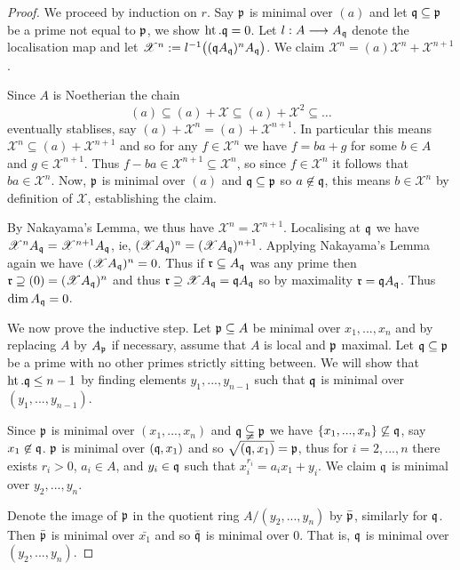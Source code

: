 \documentclass[12pt]{article}
\theoremstyle{plain}
\theoremstyle{definition}
\newcommand{\scr}[1]{\mathscr{#1}}
\newcommand{\lto}{\longrightarrow}
\begin{document}
	\begin{proof}
		We proceed by induction on $r$. Say $\frak{p}$ is minimal over $(a)$ and let $\frak{q} \subseteq \frak{p}$ be a prime not equal to $\frak{p}$, we show $\operatorname{ht}.\frak{q} = 0$. Let $l: A \lto A_\frak{q}$ denote the localisation map and let $\scr{X}^n:= l^{-1}\big((\frak{q}A_\frak{q})^nA_\frak{q}\big)$. We claim $\scr{X}^n = (a)\scr{X}^n + \scr{X}^{n+1}$.
		
		Since $A$ is Noetherian the chain
		\[(a) \subseteq (a) + \scr{X} \subseteq (a) + \scr{X}^2 \subseteq \hdots\]
		eventually stablises, say $(a) + \scr{X}^n = (a) + \scr{X}^{n+1}$. In particular this means $\scr{X}^n \subseteq (a) + \scr{X}^{n+1}$ and so for any $f \in \scr{X}^n$ we have $f = ba + g$ for some $b \in A$ and $g \in \scr{X}^{n+1}$. Thus $f - ba \in \scr{X}^{n+1} \subseteq \scr{X}^n$, so since $f \in \scr{X}^n$ it follows that $ba \in \scr{X}^n$. Now, $\frak{p}$ is minimal over $(a)$ and $\frak{q} \subseteq \frak{p}$ so $a \not\in \frak{q}$, this means $b \in \scr{X}^n$ by definition of $\scr{X}$, establishing the claim.
		
		By Nakayama's Lemma, we thus have $\scr{X}^n = \scr{X}^{n+1}$. Localising at $\frak{q}$ we have $\scr{X}^nA_\frak{q} = \scr{X}^{n+1}A_\frak{q}$, ie, $(\scr{X}A_\frak{q})^n = (\scr{X}A_\frak{q})^{n+1}$. Applying Nakayama's Lemma again we have $(\scr{X} A_\frak{q})^n = 0$. Thus if $\frak{r} \subseteq A_\frak{q}$ was any prime then $\frak{r} \supseteq (0) = (\scr{X}A_\frak{q})^n$ and thus $\frak{r} \supseteq \scr{X}A_\frak{q} = \frak{q}A_\frak{q}$ so by maximality $\frak{r} = \frak{q}A_\frak{q}$. Thus $\operatorname{dim}A_\frak{q} = 0$.
		
		We now prove the inductive step. Let $\frak{p} \subseteq A$ be minimal over $x_1,...,x_n$ and by replacing $A$ by $A_\frak{p}$ if necessary, assume that $A$ is local and $\frak{p}$ maximal. Let $\frak{q} \subseteq \frak{p}$ be a prime with no other primes strictly sitting between. We will show that $\operatorname{ht}.\frak{q} \leq n-1$ by finding elements $y_1,...,y_{n-1}$ such that $\frak{q}$ is minimal over $(y_1,...,y_{n-1})$.
		
		Since $\frak{p}$ is minimal over $(x_1,...,x_n)$ and $\frak{q} \subsetneqq \frak{p}$ we have $\lbrace x_1,...,x_n \rbrace \not\subseteq \frak{q}$, say $x_1 \not\in \frak{q}$. $\frak{p}$ is minimal over $(\frak{q},x_1)$ and so $\sqrt{(\frak{q},x_1)} = \frak{p}$, thus for $i = 2,...,n$ there exists $r_i > 0$, $a_i \in A$, and $y_i \in \frak{q}$ such that $x_i^{r_i} = a_ix_1 + y_i$. We claim $\frak{q}$ is minimal over $y_2,...,y_{n}$.
		
		Denote the image of $\frak{p}$ in the quotient ring $A/(y_2,...,y_n)$ by $\bar{\frak{p}}$, similarly for $\frak{q}$. Then $\bar{\frak{p}}$ is minimal over $\bar{x_1}$ and so $\bar{\frak{q}}$ is minimal over $0$. That is, $\frak{q}$ is minimal over $(y_2,...,y_n)$.
	\end{proof}
\end{document}
